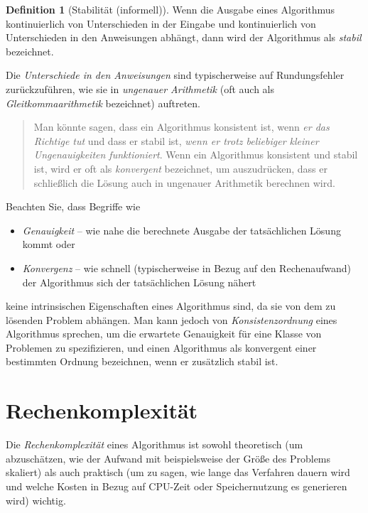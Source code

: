 \documentclass[
]{book}
\providecommand{\tightlist}{%
  \setlength{\itemsep}{0pt}\setlength{\parskip}{0pt}}
\newenvironment {JHSAYS} [0] {\begin{quote}\color{jhsc}} {\end{quote}}
\theoremstyle{definition}
\newtheorem{definition}{Definition}[chapter]
\theoremstyle{definition}
\theoremstyle{definition}
\theoremstyle{definition}
\theoremstyle{remark}
\begin{document}
\begin{definition}[Stabilität (informell)]
\protect\hypertarget{def:stability}{}\label{def:stability}Wenn die Ausgabe eines Algorithmus kontinuierlich von Unterschieden in der Eingabe und kontinuierlich von Unterschieden in den Anweisungen abhängt, dann wird der Algorithmus als \emph{stabil} bezeichnet.
\end{definition}

Die \emph{Unterschiede in den Anweisungen} sind typischerweise auf Rundungsfehler zurückzuführen, wie sie in \emph{ungenauer Arithmetik} (oft auch als \emph{Gleitkommaarithmetik} bezeichnet) auftreten.

\leavevmode\hypertarget{rem-algo-kons-stab}{}%
\begin{JHSAYS}
Man könnte sagen, dass ein Algorithmus konsistent ist, wenn \emph{er das Richtige tut} und dass er stabil ist, \emph{wenn er trotz beliebiger kleiner Ungenauigkeiten funktioniert}. Wenn ein Algorithmus konsistent und stabil ist, wird er oft als \emph{konvergent} bezeichnet, um auszudrücken, dass er schließlich die Lösung auch in ungenauer Arithmetik berechnen wird.

\end{JHSAYS}

Beachten Sie, dass Begriffe wie

\begin{itemize}
\tightlist
\item
  \emph{Genauigkeit} -- wie nahe die berechnete Ausgabe der tatsächlichen Lösung kommt oder
\item
  \emph{Konvergenz} -- wie schnell (typischerweise in Bezug auf den Rechenaufwand) der Algorithmus sich der tatsächlichen Lösung nähert
\end{itemize}

keine intrinsischen Eigenschaften eines Algorithmus sind, da sie von dem zu lösenden Problem abhängen.
Man kann jedoch von \emph{Konsistenzordnung} eines Algorithmus sprechen, um die erwartete Genauigkeit für eine Klasse von Problemen zu spezifizieren, und einen Algorithmus als konvergent einer bestimmten Ordnung bezeichnen, wenn er zusätzlich stabil ist.

\hypertarget{rechenkomplexituxe4t}{%
\section{Rechenkomplexität}\label{rechenkomplexituxe4t}}

Die \emph{Rechenkomplexität} eines Algorithmus ist sowohl theoretisch (um abzuschätzen, wie der Aufwand mit beispielsweise der Größe des Problems skaliert) als auch praktisch (um zu sagen, wie lange das Verfahren dauern wird und welche Kosten in Bezug auf CPU-Zeit oder Speichernutzung es generieren wird) wichtig.
\end{document}
